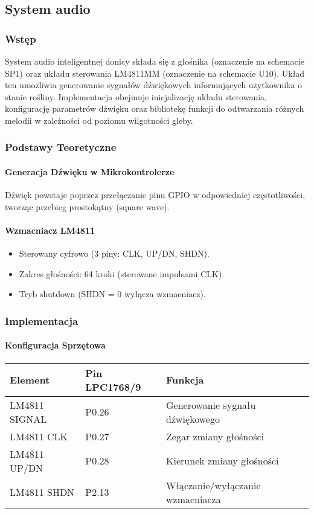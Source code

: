 \subsection{System audio}

\subsubsection{Wstęp}
System audio inteligentnej donicy składa się z głośnika (oznaczenie na schemacie SP1) oraz układu sterowania LM4811MM (oznaczenie na schemacie U10). Układ ten umożliwia generowanie sygnałów dźwiękowych informujących użytkownika o stanie rośliny. Implementacja obejmuje inicjalizację układu sterowania, konfigurację parametrów dźwięku oraz bibliotekę funkcji do odtwarzania różnych melodii w zależności od poziomu wilgotności gleby.


\subsubsection{Podstawy Teoretyczne}
\paragraph{Generacja Dźwięku w Mikrokontrolerze}
Dźwięk powstaje poprzez przełączanie pinu GPIO w odpowiedniej częstotliwości, tworząc przebieg prostokątny (square wave).


\paragraph{Wzmacniacz LM4811}
\begin{itemize}
    \item Sterowany cyfrowo (3 piny: CLK, UP/DN, SHDN).
    \item Zakres głośności: 64 kroki (sterowane impulsami CLK).
    \item Tryb shutdown (SHDN = 0 wyłącza wzmacniacz).
\end{itemize}

\subsubsection{Implementacja}
\paragraph{Konfiguracja Sprzętowa}
\begin{tabular}{|l|l|l|}
\hline
\textbf{Element} & \textbf{Pin LPC1768/9} & \textbf{Funkcja} \\
\hline
LM4811 SIGNAL& P0.26 & Generowanie sygnału dźwiękowego \\
LM4811 CLK & P0.27 & Zegar zmiany głośności \\
LM4811 UP/DN & P0.28 & Kierunek zmiany głośności \\
LM4811 SHDN & P2.13 & Włączanie/wyłączanie wzmacniacza \\
\hline
\end{tabular}

